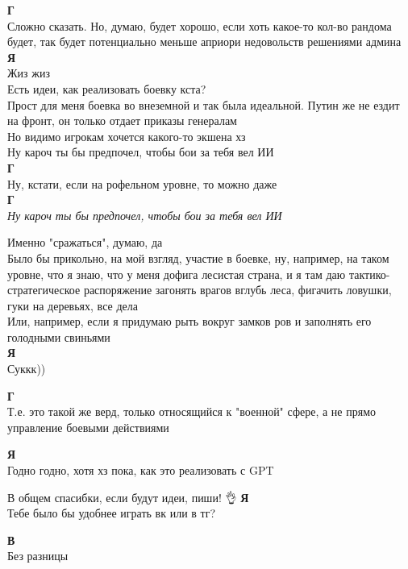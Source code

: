 \textbf{Г} \\
Сложно сказать. Но, думаю, будет хорошо, если хоть какое-то кол-во рандома будет, так будет потенциально меньше априори недовольств решениями админа\\

\textbf{Я} \\
Жиз жиз\\

Есть идеи, как реализовать боевку кста?\\

Прост для меня боевка во внеземной и так была идеальной. Путин же не ездит на фронт, он только отдает приказы генералам\\

Но видимо игрокам хочется какого-то экшена хз\\
Ну кароч ты бы предпочел, чтобы бои за тебя вел ИИ\\

\textbf{Г} \\
Ну, кстати, если на рофельном уровне, то можно даже\\

\textbf{Г} \\
\textit{Ну кароч ты бы предпочел, чтобы бои за тебя вел ИИ}

Именно "сражаться", думаю, да\\

Было бы прикольно, на мой взгляд, участие в боевке, ну, например, на таком уровне, что я знаю, что у меня дофига лесистая страна, и я там даю тактико-стратегическое распоряжение загонять врагов вглубь леса, фигачить ловушки, гуки на деревьях, все дела\\

Или, например, если я придумаю рыть вокруг замков ров и заполнять его голодными свиньями\\

\textbf{Я} \\
Суккк))

\textbf{Г} \\
Т.е. это такой же верд, только относящийся к "военной" сфере, а не прямо управление боевыми действиями

\textbf{Я} \\
Годно годно, хотя хз пока, как это реализовать с GPT

В общем спасибки, если будут идеи, пиши! 👌
\textbf{Я} \\
Тебе было бы удобнее играть вк или в тг?

\textbf{В} \\
Без разницы


